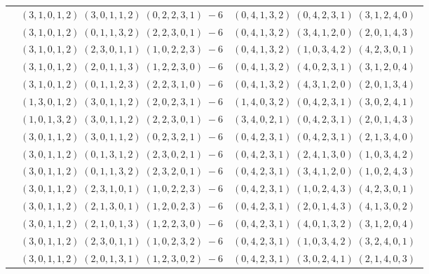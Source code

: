 \documentclass[11pt]{article}
\begin{document}
\begin{longtable}[l]{|c|c|c|}
 \cline{2-3} 
 & $(3 ,1 ,0 ,1 ,2) \;(3 ,0 ,1 ,1 ,2) \;(0 ,2 ,2 ,3 ,1) \;-6$ & $(0 ,4 ,1 ,3 ,2) \;(0 ,4 ,2 ,3 ,1) \;(3 ,1 ,2 ,4 ,0) \;$\\ 
 \cline{2-3} 
 & $(3 ,1 ,0 ,1 ,2) \;(0 ,1 ,1 ,3 ,2) \;(2 ,2 ,3 ,0 ,1) \;-6$ & $(0 ,4 ,1 ,3 ,2) \;(3 ,4 ,1 ,2 ,0) \;(2 ,0 ,1 ,4 ,3) \;$\\ 
 \cline{2-3} 
 & $(3 ,1 ,0 ,1 ,2) \;(2 ,3 ,0 ,1 ,1) \;(1 ,0 ,2 ,2 ,3) \;-6$ & $(0 ,4 ,1 ,3 ,2) \;(1 ,0 ,3 ,4 ,2) \;(4 ,2 ,3 ,0 ,1) \;$\\ 
 \cline{2-3} 
 & $(3 ,1 ,0 ,1 ,2) \;(2 ,0 ,1 ,1 ,3) \;(1 ,2 ,2 ,3 ,0) \;-6$ & $(0 ,4 ,1 ,3 ,2) \;(4 ,0 ,2 ,3 ,1) \;(3 ,1 ,2 ,0 ,4) \;$\\ 
 \cline{2-3} 
 & $(3 ,1 ,0 ,1 ,2) \;(0 ,1 ,1 ,2 ,3) \;(2 ,2 ,3 ,1 ,0) \;-6$ & $(0 ,4 ,1 ,3 ,2) \;(4 ,3 ,1 ,2 ,0) \;(2 ,0 ,1 ,3 ,4) \;$\\ 
 \cline{2-3} 
 & $(1 ,3 ,0 ,1 ,2) \;(3 ,0 ,1 ,1 ,2) \;(2 ,0 ,2 ,3 ,1) \;-6$ & $(1 ,4 ,0 ,3 ,2) \;(0 ,4 ,2 ,3 ,1) \;(3 ,0 ,2 ,4 ,1) \;$\\ 
 \cline{2-3} 
 & $(1 ,0 ,1 ,3 ,2) \;(3 ,0 ,1 ,1 ,2) \;(2 ,2 ,3 ,0 ,1) \;-6$ & $(3 ,4 ,0 ,2 ,1) \;(0 ,4 ,2 ,3 ,1) \;(2 ,0 ,1 ,4 ,3) \;$\\ 
 \cline{2-3} 
 & $(3 ,0 ,1 ,1 ,2) \;(3 ,0 ,1 ,1 ,2) \;(0 ,2 ,3 ,2 ,1) \;-6$ & $(0 ,4 ,2 ,3 ,1) \;(0 ,4 ,2 ,3 ,1) \;(2 ,1 ,3 ,4 ,0) \;$\\ 
 \cline{2-3} 
 & $(3 ,0 ,1 ,1 ,2) \;(0 ,1 ,3 ,1 ,2) \;(2 ,3 ,0 ,2 ,1) \;-6$ & $(0 ,4 ,2 ,3 ,1) \;(2 ,4 ,1 ,3 ,0) \;(1 ,0 ,3 ,4 ,2) \;$\\ 
 \cline{2-3} 
 & $(3 ,0 ,1 ,1 ,2) \;(0 ,1 ,1 ,3 ,2) \;(2 ,3 ,2 ,0 ,1) \;-6$ & $(0 ,4 ,2 ,3 ,1) \;(3 ,4 ,1 ,2 ,0) \;(1 ,0 ,2 ,4 ,3) \;$\\ 
 \cline{2-3} 
 & $(3 ,0 ,1 ,1 ,2) \;(2 ,3 ,1 ,0 ,1) \;(1 ,0 ,2 ,2 ,3) \;-6$ & $(0 ,4 ,2 ,3 ,1) \;(1 ,0 ,2 ,4 ,3) \;(4 ,2 ,3 ,0 ,1) \;$\\ 
 \cline{2-3} 
 & $(3 ,0 ,1 ,1 ,2) \;(2 ,1 ,3 ,0 ,1) \;(1 ,2 ,0 ,2 ,3) \;-6$ & $(0 ,4 ,2 ,3 ,1) \;(2 ,0 ,1 ,4 ,3) \;(4 ,1 ,3 ,0 ,2) \;$\\ 
 \cline{2-3} 
 & $(3 ,0 ,1 ,1 ,2) \;(2 ,1 ,0 ,1 ,3) \;(1 ,2 ,2 ,3 ,0) \;-6$ & $(0 ,4 ,2 ,3 ,1) \;(4 ,0 ,1 ,3 ,2) \;(3 ,1 ,2 ,0 ,4) \;$\\ 
 \cline{2-3} 
 & $(3 ,0 ,1 ,1 ,2) \;(2 ,3 ,0 ,1 ,1) \;(1 ,0 ,2 ,3 ,2) \;-6$ & $(0 ,4 ,2 ,3 ,1) \;(1 ,0 ,3 ,4 ,2) \;(3 ,2 ,4 ,0 ,1) \;$\\ 
 \cline{2-3} 
 & $(3 ,0 ,1 ,1 ,2) \;(2 ,0 ,1 ,3 ,1) \;(1 ,2 ,3 ,0 ,2) \;-6$ & $(0 ,4 ,2 ,3 ,1) \;(3 ,0 ,2 ,4 ,1) \;(2 ,1 ,4 ,0 ,3) \;$\\ 

\end{longtable}
\end{document}
